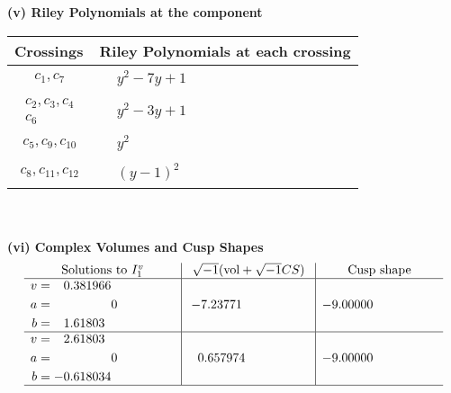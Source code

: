 \documentclass[1p]{elsarticle_modified}
\theoremstyle{definition}
\newcommand{\I}{\sqrt{-1}}
\begin{document}
\newpage\renewcommand{\arraystretch}{1}
\flushleft \textbf{(v) Riley Polynomials at the component}\newline \\
\begin{tabular}{m{50pt}|m{274pt}}
Crossings & \hspace{64pt}Riley Polynomials at each crossing \\
\hline $$\begin{aligned}c_{1},c_{7}\end{aligned}$$&$\begin{aligned}
&y^2-7 y+1
\end{aligned}$\\
\hline $$\begin{aligned}c_{2},c_{3},c_{4}\\c_{6}\end{aligned}$$&$\begin{aligned}
&y^2-3 y+1
\end{aligned}$\\
\hline $$\begin{aligned}c_{5},c_{9},c_{10}\end{aligned}$$&$\begin{aligned}
&y^2
\end{aligned}$\\
\hline $$\begin{aligned}c_{8},c_{11},c_{12}\end{aligned}$$&$\begin{aligned}
&(y-1)^2
\end{aligned}$\\
\hline
\end{tabular}\\~\\
\newpage\flushleft \textbf{(vi) Complex Volumes and Cusp Shapes}
$$\begin{array}{c|c|c}  
\text{Solutions to }I^v_{1}& \I (\text{vol} + \sqrt{-1}CS) & \text{Cusp shape}\\
 \hline 
\begin{aligned}
v &= \phantom{-}0.381966\phantom{ +0.000000I} \\
a &= \phantom{-0.000000 } 0 \\
b &= \phantom{-}1.61803\phantom{ +0.000000I}\end{aligned}
 & -7.23771\phantom{ +0.000000I} & -9.00000\phantom{ +0.000000I} \\ \hline\begin{aligned}
v &= \phantom{-}2.61803\phantom{ +0.000000I} \\
a &= \phantom{-0.000000 } 0 \\
b &= -0.618034\phantom{ +0.000000I}\end{aligned}
 & \phantom{-}0.657974\phantom{ +0.000000I} & -9.00000\phantom{ +0.000000I}\\
 \hline 
 \end{array}$$\newpage
\end{document}
